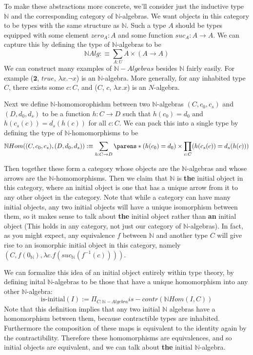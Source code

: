 \documentclass[11pt]{article}
\newcommand{\N}{\mathbb{N}}
\newcommand{\2}{\textbf{2}}
\begin{document}
To make these abstractions more concrete, we'll consider just the inductive type $\N$ and the corresponding category of $\N$-algebras.
We want objects in this category to be types with the same structure as $\N$.
Such a type $A$ should be types equipped with some element $zero_A : A$ and some function $suc_A : A \rightarrow A$.
We can capture this by defining the type of $\N$-algebras to be
\begin{equation*}
  \N Alg :\equiv \sum_{A : U} A \times (A \rightarrow A)
\end{equation*}
We can construct many examples of $\N-Algebras$ besides $\N$ fairly easily.
For example ($\2$, $true$, $\lambda x . \neg x$) is an $\N$-algebra.
More generally, for any inhabited type $C$, there exists some $c : C$, and  ($C$, $c$, $\lambda x . x$) is an $N$-algebra.

Next we define $\N$-homomorophishm between two $\N$-algebras $(C, c_0, c_s)$ and $(D, d_0, d_s)$ to be a function $h: C \rightarrow D$ such that $h(c_0) = d_0$ and $h(c_s(c)) = d_s(h(c))$ for all $c : C$. We can pack this into a single type by defining the type of $\N$-homomorphisms to be
\begin{equation*}
  \N Hom((C,c_0,c_s), (D,d_0,d_s)) :\equiv \sum_{h : C \rightarrow D}\parens*{(h(c_0)=d_0) \times \prod_{c : C} (h(c_s(c))=d_s(h(c)))}
\end{equation*}

Then together these form a category whose objects are the $\N$-algebras and whose arrows are the $\N$-homomorphisms.
Then we claim that $\N$ is \textbf{the} initial object in this category, where an initial object is one that has a unique arrow from it to any other object in the category.
Note that while a category can have many initial objects, any two initial objects will have a unique isomorphism between them, so it makes sense to talk about \textbf{the} initial object rather than \textbf{an} initial object (This holds in any category, not just our category of $\N$-algebras).
In fact, as you might expect, any equivalence $f$ between $\N$ and another type $C$ will give rise to an isomorphic initial object in this category, namely $(C, f(0_\N), \lambda c . f(suc_\N(f^{-1}(c))))$.

We can formalize this idea of an initial object entirely within type theory, by defining inital $\N$-algebras to be those that have a unique homomorphism into any other $\N$-algebra: 
\begin{equation*}
  \text{is-initial}(I) := \Pi_{C : \N-Algebra} is-contr (\N Hom(I, C))
\end{equation*}
Note that this definition implies that any two initial $\N$ algebras have a homomorphism between them, because contractible types are inhabited.
Furthermore the composition of these maps is equivalent to the identity again by the contractibility.
Therefore these homomorphisms are equivalences, and so initial objects are equivalent, and we can talk about \textbf{the} initial $\N$-algebra.
\end{document}
